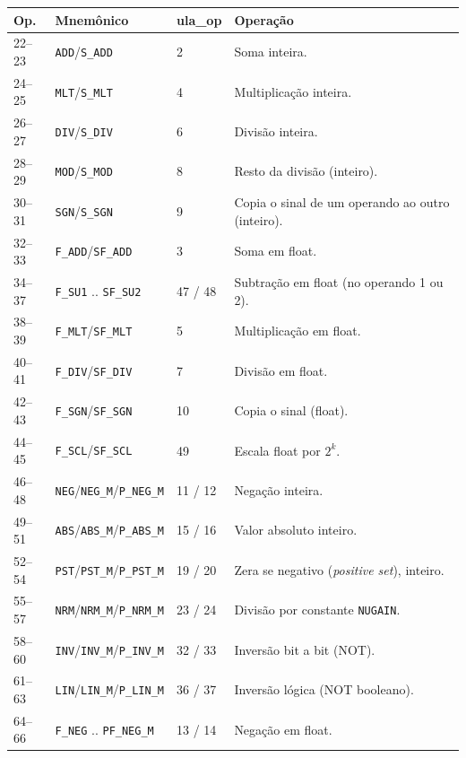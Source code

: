 \begin{longtable}{l l l l}
\toprule
\textbf{Op.} & \textbf{Mnemônico} & \textbf{ula\_op} & \textbf{Operação} \\
\midrule
\endhead
22--23  & \lstinline|ADD|/\lstinline|S_ADD|     & 2     & Soma inteira. \\
24--25  & \lstinline|MLT|/\lstinline|S_MLT|     & 4     & Multiplicação inteira. \\
26--27  & \lstinline|DIV|/\lstinline|S_DIV|     & 6     & Divisão inteira. \\
28--29  & \lstinline|MOD|/\lstinline|S_MOD|     & 8     & Resto da divisão (inteiro). \\
30--31  & \lstinline|SGN|/\lstinline|S_SGN|     & 9     & Copia o sinal de um operando ao outro (inteiro). \\
32--33  & \lstinline|F_ADD|/\lstinline|SF_ADD|  & 3     & Soma em float. \\
34--37  & \lstinline|F_SU1| .. \lstinline|SF_SU2|& 47 / 48& Subtração em float (no operando 1 ou 2). \\
38--39  & \lstinline|F_MLT|/\lstinline|SF_MLT|  & 5     & Multiplicação em float. \\
40--41  & \lstinline|F_DIV|/\lstinline|SF_DIV|  & 7     & Divisão em float. \\
42--43  & \lstinline|F_SGN|/\lstinline|SF_SGN|  & 10    & Copia o sinal (float). \\
44--45  & \lstinline|F_SCL|/\lstinline|SF_SCL|  & 49    & Escala float por $2^{k}$. \\
46--48  & \lstinline|NEG|/\lstinline|NEG_M|/\lstinline|P_NEG_M|& 11 / 12& Negação inteira. \\
49--51  & \lstinline|ABS|/\lstinline|ABS_M|/\lstinline|P_ABS_M|& 15 / 16& Valor absoluto inteiro. \\
52--54  & \lstinline|PST|/\lstinline|PST_M|/\lstinline|P_PST_M|& 19 / 20& Zera se negativo (\emph{positive set}), inteiro. \\
55--57  & \lstinline|NRM|/\lstinline|NRM_M|/\lstinline|P_NRM_M|& 23 / 24& Divisão por constante \lstinline|NUGAIN|. \\
58--60  & \lstinline|INV|/\lstinline|INV_M|/\lstinline|P_INV_M|& 32 / 33& Inversão bit a bit (NOT). \\
61--63  & \lstinline|LIN|/\lstinline|LIN_M|/\lstinline|P_LIN_M|& 36 / 37& Inversão lógica (NOT booleano). \\
64--66  & \lstinline|F_NEG| .. \lstinline|PF_NEG_M|& 13 / 14& Negação em float. \\

\end{longtable}

